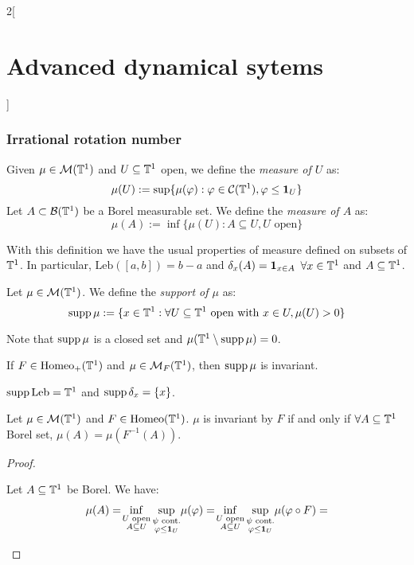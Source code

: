 \documentclass[../../../main_math.tex]{subfiles}
\begin{document}
\begin{multicols}{2}[\section{Advanced dynamical sytems}]
  \subsubsection{Irrational rotation number}
  \begin{definition}
    Given $\mu\in \mathcal{M}(\mathbb{T}^1)$ and $U\subseteq \mathbb{T}^1$ open, we define the \emph{measure of $U$} as:
    $$
      \mu(U):=\sup\{\mu(\varphi):\varphi\in\mathcal{C}(\mathbb{T}^1),\varphi\leq \boldsymbol{\mathrm{1}}_{U}\}
    $$
    Let $A\subset \mathcal{B}(\mathbb{T}^1)$ be a Borel measurable set. We define the \emph{measure of $A$} as:
    $$
      \mu(A):=\inf\{\mu(U):A\subseteq U, U\text{ open}\}
    $$
  \end{definition}
  \begin{remark}
    With this definition we have the usual properties of measure defined on subsets of $\mathbb{T}^1$. In particular, $\text{Leb}([a,b])=b-a$ and $\delta_x(A)=\boldsymbol{\mathrm{1}}_{x\in A}$ $\forall x\in \mathbb{T}^1$ and $A\subseteq \mathbb{T}^1$.
  \end{remark}
  \begin{definition}
    Let $\mu\in \mathcal{M}(\mathbb{T}^1)$. We define the \emph{support of $\mu$} as:
    $$
      \operatorname{supp}\mu:=\{x\in\mathbb{T}^1:\forall U\subseteq \mathbb{T}^1\text{ open with } x\in U,\mu(U)>0\}
    $$
  \end{definition}
  \begin{remark}
    Note that $\operatorname{supp}\mu $ is a closed set and $\mu(\mathbb{T}^1\setminus \operatorname{supp}\mu) = 0$.
  \end{remark}
  \begin{remark}
    If $F\in \mathrm{Homeo}_+(\mathbb{T}^1)$ and $\mu\in \mathcal{M}_F(\mathbb{T}^1)$, then $\operatorname{supp}\mu$ is invariant.
  \end{remark}
  \begin{remark}
    $\operatorname{supp}\text{Leb}=\mathbb{T}^1$ and $\operatorname{supp}\delta_{x}=\{x\}$.
  \end{remark}
  \begin{proposition}
    Let $\mu\in \mathcal{M}(\mathbb{T}^1)$ and $F\in\mathrm{Homeo}(\mathbb{T}^1)$. $\mu$ is invariant by $F$ if and only if $\forall A\subseteq \mathbb{T}^1$ Borel set, $\mu(A)=\mu(F^{-1}(A))$.
  \end{proposition}
  \begin{proof}
    \begin{itemizeiff}
      Let $A\subseteq \mathbb{T}^1$ be Borel. We have:
      \begin{multline*}
        \mu(A) =\!\inf_{\substack{U\text{ open} \\A\subseteq U}}\sup_{\substack{\psi\text{ cont.}\\\varphi\leq \indi{U}}}\!\mu(\varphi)=\!\inf_{\substack{U\text{ open} \\A\subseteq U}}\sup_{\substack{\psi\text{ cont.}\\\varphi\leq \indi{U}}}\!\mu(\varphi\circ F)=\\

\end{multline*}
\end{itemizeiff}
\end{proof}
\end{multicols}
\end{document}
